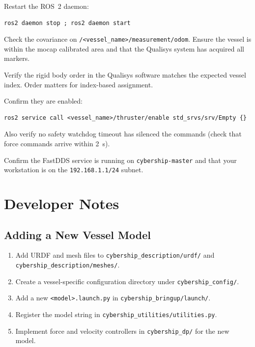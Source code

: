 \documentclass[12pt,a4paper]{article}
\begin{document}
	\begin{description}[leftmargin=4cm, style=nextline]
		\item[Topics not visible] Restart the ROS~2 daemon:
		\begin{lstlisting}[style=bash]
			ros2 daemon stop ; ros2 daemon start\end{lstlisting}
		\item[EKF diverging] Check the covariance on
		\texttt{/<vessel\_name>/measurement/odom}. Ensure the vessel is within the mocap
		calibrated area and that the Qualisys system has acquired all markers.
		\item[Rigid body order mismatch] Verify the rigid body order in the Qualisys software matches
		the expected vessel index. Order matters for index-based assignment.
		\item[Thrusters unresponsive] Confirm they are enabled:
		\begin{lstlisting}[style=bash]
			ros2 service call <vessel_name>/thruster/enable std_srvs/srv/Empty {}\end{lstlisting}
		Also verify no safety watchdog timeout has silenced the commands
		(check that force commands arrive within 2~s).
		\item[Discovery issues] Confirm the FastDDS service is running on
		\texttt{cybership-master} and that your workstation is on the
		\texttt{192.168.1.1/24} subnet.
	\end{description}
	
	\section{Developer Notes}
	\label{sec:dev}
	
	\subsection{Adding a New Vessel Model}
	
	\begin{enumerate}
		\item Add URDF and mesh files to \texttt{cybership\_description/urdf/} and
		\texttt{cybership\_description/meshes/}.
		\item Create a vessel-specific configuration directory under \texttt{cybership\_config/}.
		\item Add a new \texttt{<model>.launch.py} in \texttt{cybership\_bringup/launch/}.
		\item Register the model string in \texttt{cybership\_utilities/utilities.py}.
		\item Implement force and velocity controllers in \texttt{cybership\_dp/} for the new model.
	\end{enumerate}
	
\end{document}
